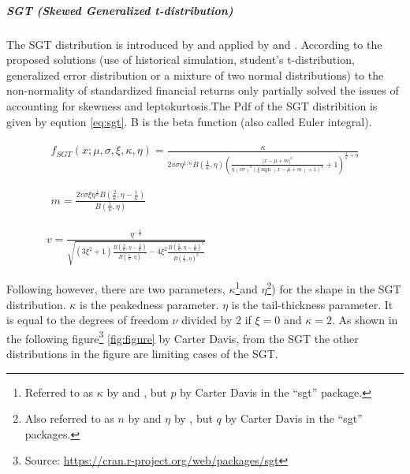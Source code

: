 \documentclass[a4paper, nobind]{templates/ociamthesis}
\begin{document}
\hypertarget{sgtinfo}{%
\subparagraph{SGT (Skewed Generalized t-distribution)}\label{sgtinfo}}

\noindent The SGT distribution is introduced by \textcite{theodossiou1998} and applied by \textcite{bali2007} and \textcite{bali2008}. According to \textcite{bali2008} the proposed solutions (use of historical simulation, student's t-distribution, generalized error distribution or a mixture of two normal distributions) to the non-normality of standardized financial returns only partially solved the issues of accounting for skewness and leptokurtosis.The Pdf of the SGT distribition is given by eqution \eqref{eq:sgt}. B is the beta function (also called Euler integral).

\begin{equation}
\begin{array}{c}
\begin{array}{c}
f_{S G T}(x ; \mu, \sigma, \xi, \kappa, \eta)=\frac{\kappa}{2 v \sigma \eta^{1 / \kappa} B\left(\frac{1}{\kappa}, \eta\right)\left(\frac{|x-\mu +m|^{\kappa}}{\eta(v \sigma)^{\kappa}(\xi \operatorname{sign}(x-\mu + m)+1)^{\kappa}}+1\right)^{\frac{1}{\kappa}+\eta}} \\ \\ \\ 

m=\frac{2 v \sigma \xi \eta^{\frac{1}{\kappa}} B\left(\frac{2}{\kappa}, \eta-\frac{1}{\kappa}\right)}{B\left(\frac{1}{\kappa}, \eta\right)}
\end{array}
\\ \\ \\ 
v=\frac{\eta^{-\frac{1}{\kappa}}}{\sqrt{\left(3 \xi^{2}+1\right) \frac{B\left(\frac{3}{\kappa}, \eta-\frac{2}{\kappa}\right)}{B\left(\frac{1}{\kappa}, \eta\right)}-4 \xi^{2} \frac{B\left(\frac{2}{\kappa}, \eta-\frac{1}{\kappa}\right)^{2}}{B\left(\frac{1}{\kappa}, \eta\right)^{2}}}}
\end{array}
\label{eq:sgt}
\end{equation}

\noindent Following \textcite{theodossiou1998} however, there are two parameters, \(\kappa\)\footnote{Referred to as \(\kappa\) by \textcite{theodossiou1998} and \textcite{bali2008}, but \(p\) by Carter Davis in the ``sgt'' package.}and \(\eta\)\footnote{Also referred to as \(n\) by \textcite{theodossiou1998} and \(\eta\) by \textcite{bali2008}, but \(q\) by Carter Davis in the ``sgt'' packages.}) for the shape in the SGT distribution. \(\kappa\) is the peakedness parameter. \(\eta\) is the tail-thickness parameter. It is equal to the degrees of freedom \(\nu\) divided by 2 if \(\xi = 0\) and \(\kappa = 2\). As shown in the following figure\footnote{Source: \href{https://cran.r-project.org/web/packages/sgt\%22}{https://cran.r-project.org/web/packages/sgt}} \ref{fig:figure} by Carter Davis, from the SGT the other distributions in the figure are limiting cases of the SGT.
\end{document}
